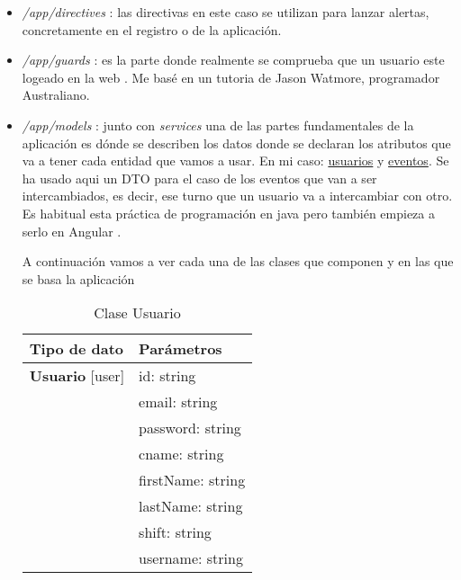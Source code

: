 \begin{itemize}

	\item \emph{/app/directives} : las directivas  en este caso se utilizan para lanzar alertas, concretamente en el registro o  de la aplicación. 
	
	\item \emph{/app/guards} : es la parte donde realmente se comprueba que un usuario este logeado en la web \cite{guards}. Me basé en un tutoria \cite{logintut} de Jason Watmore, programador Australiano. 
	
	\item \emph{/app/models} : junto con \emph{services} una de las partes fundamentales de la aplicación es dónde se describen los datos donde se declaran los atributos que va a tener cada entidad que vamos a usar. En mi caso: \underline{usuarios} y \underline{eventos}.  
	Se ha usado aqui un DTO \cite{dto} para el caso de los eventos que van a ser intercambiados, es decir, ese turno que un usuario va a intercambiar con otro. Es habitual esta práctica de programación en java pero también empieza a serlo en Angular \cite{dto2}.
	
	A continuación vamos a ver cada una de las clases que componen y en las que se basa la aplicación
	
\begin{table}[H]
\centering
\begin{tabular}{|l|l|}
\hline
Tipo de dato & Parámetros  \\
\hline \hline
\textbf{Usuario} [user] & id: string \\ 
    & email: string \\
    & password: string \\
    & cname: string \\
    & firstName: string \\
    & lastName: string \\
    & shift: string \\
    & username: string \\ \hline
\end{tabular}
\caption{Clase Usuario}
\end{table}




\end{itemize}
